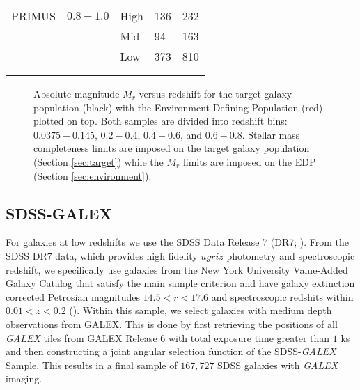 \documentclass{emulateapj}
\begin{document}
\begin{table}
\begin{center}
\begin{tabular}{lllll}
            &               &               &                       &                           \\ \hline
  PRIMUS    &$0.8-1.0$      &High           &136                       &232                           \\
            &               &Mid            &94                       &163                           \\
            &               &Low            &373                       &810                           \\
            &               &               &                       &                           \\ \hline
  \multicolumn{5}{l}{}                                             \\       
    \end{tabular} 
  \end{center}
\end{table}

\begin{figure*}
    \begin{center}
        \leavevmode
        \label{fig:targetEDP}
        \caption{Absolute magnitude $M_{r}$ versus redshift for the target galaxy population (black) with the 
Environment Defining Population (red) plotted on top. Both samples are divided into redshift bins:$0.0375-0.145$, 
$0.2-0.4$, $0.4-0.6$, and $0.6-0.8$. Stellar mass completeness limits are imposed on the target galaxy population (Section \ref{sec:target}) 
while the $M_{r}$ limits are imposed on the EDP (Section \ref{sec:environment}).}
    \end{center}
\end{figure*}

\subsection{SDSS-GALEX} \label{sec:sdss}
For galaxies at low redshifts we use the SDSS Data Release 7 (DR7; \cite{Abazajian:2009aa}). 
From the SDSS DR7 data, which provides high fidelity $ugriz$ photometry and spectroscopic redshift, we specifically use galaxies from the New York University 
Value-Added Galaxy Catalog that satisfy the main sample criterion and have galaxy extinction corrected Petrosian magnitudes $14.5 < r < 17.6$ 
and spectroscopic redshits within $0.01<z<0.2$ (\cite{Blanton:2005aa}). 
Within this sample, we select galaxies with medium depth observations from GALEX. 
This is done by first retrieving the positions of all {\em GALEX} tiles from GALEX Release 6 with total exposure time greater than $1$ ks and then constructing 
a joint angular selection function of the SDSS-{\em GALEX} Sample. 
This results in a final sample of $167,727$ SDSS galaxies with {\em GALEX} imaging. 
\end{document}
